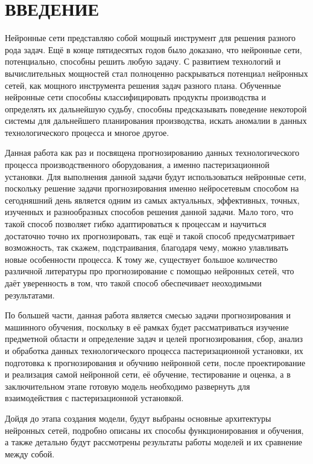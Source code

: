 \sectionbreak \section*{ 
    \gostTitleFont
    \redline
    ВВЕДЕНИЕ
}
\titlespace

{\gostFont

\par \redline Нейронные сети представляю собой мощный инструмент для решения разного рода задач. Ещё в конце пятидесятых годов было доказано, что нейронные сети, потенциально, способны решить любую задачу. С развитием технологий и вычислительных мощностей стал полноценно раскрываться потенциал нейронных сетей, как мощного инструмента решения задач разного плана. Обученные нейронные сети способны классифицировать продукты производства и определять их дальнейшую судьбу, способны предсказывать поведение некоторой системы для дальнейшего планирования производства, искать аномалии в данных технологического процесса и многое другое. 

\par \redline Данная работа как раз и посвящена прогнозированию данных технологического процесса производственного оборудования, а именно пастеризационной установки. Для выполнения данной задачи будут использоваться нейронные сети, поскольку решение задачи прогнозирования именно нейросетевым способом на сегодняшний день является одним из самых актуальных, эффективных, точных, изученных и разнообразных способов решения данной задачи. Мало того, что такой способ позволяет гибко адаптироваться к процессам и научиться достаточно точно их прогнозировать, так ещё и такой способ предусматривает возможность, так скажем, подстраивания, благодаря чему, можно улавливать новые особенности процесса. К тому же, существует большое количество различной литературы про прогнозирование с помощью нейронных сетей, что даёт уверенность в том, что такой способ обеспечивает неоходимыми результатами. 

\par \redline По большей части, данная работа является смесью задачи прогнозирования и машинного обучения, поскольку в её рамках будет рассматриваться изучение предметной области и определение задач и целей прогнозирования, сбор, анализ и обработка данных технологического процесса пастеризационной установки, их подготовка к прогнозирования и обучнию нейронной сети, после проектирование и реализация самой нейронной сети, её обучение, тестирование и оценка, а в заключительном этапе готовую модель необходимо развернуть для взаимодействия с пастеризационной установкой.

\par \redline Дойдя до этапа создания модели, будут выбраны основные архитектуры нейронных сетей, подробно описаны их способы функционирования и обучения, а также детально будут рассмотрены результаты работы моделей и их сравнение между собой.

\par
}
